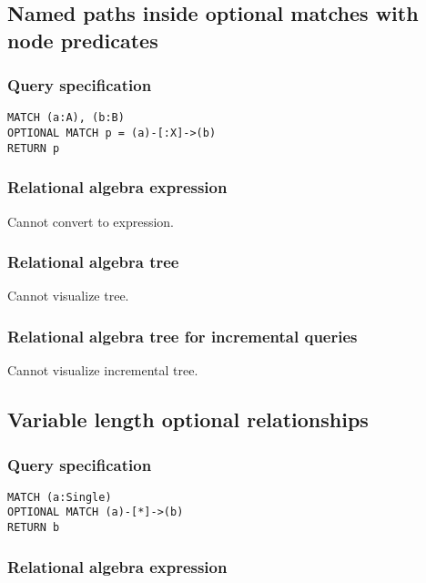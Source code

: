 \subsection{Named paths inside optional matches with node predicates}

\subsubsection*{Query specification}

\begin{lstlisting}
MATCH (a:A), (b:B)
OPTIONAL MATCH p = (a)-[:X]->(b)
RETURN p
\end{lstlisting}

\subsubsection*{Relational algebra expression}

Cannot convert to expression.

\subsubsection*{Relational algebra tree}

Cannot visualize tree.

\subsubsection*{Relational algebra tree for incremental queries}

Cannot visualize incremental tree.

\subsection{Variable length optional relationships}

\subsubsection*{Query specification}

\begin{lstlisting}
MATCH (a:Single)
OPTIONAL MATCH (a)-[*]->(b)
RETURN b
\end{lstlisting}

\subsubsection*{Relational algebra expression}


